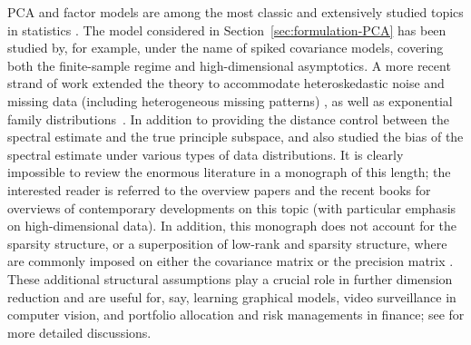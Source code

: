 PCA and factor models are among the most classic and extensively studied topics in statistics \citep{anderson1962introduction,fan2020statistical,wainwright2019high}. The model considered in Section~\ref{sec:formulation-PCA} has been studied by, for example, \citet{johnstone2001distribution,paul2007asymptotics,nadler2008finite, perry2016optimality, xie2018sequential, wang2017asymptotics, fan2018spiked, bao2020statistical}  under the name of  spiked covariance models,  
covering both the finite-sample regime and high-dimensional asymptotics.
A more recent strand of work extended the theory to accommodate heteroskedastic noise and missing data (including heterogeneous missing patterns) \citep{lounici2014high,zhang2018heteroskedastic,cai2019subspace,zhu2019high}, as well as exponential family distributions~\citep{liu2018pca}. In addition to providing the distance control between the spectral estimate and the true principle subspace, \citet{koltchinskii2016asymptotics} and \citet{fan2019distributed} also studied the bias of the spectral estimate under various types of data distributions.
It is clearly impossible to review the enormous literature in a monograph of this length; the interested reader is referred to the overview papers \citet{johnstone2018pca,fan2018PCA,vaswani2018rethinking,balzano2018streaming}  and the recent books
  \citet{fan2020statistical,wainwright2019high} for overviews of contemporary developments on this topic (with particular emphasis on high-dimensional data).
In addition, this monograph does not account for the sparsity structure, or a superposition of low-rank and sparsity structure,  where are commonly imposed on either the covariance matrix or the precision matrix \citep{JohLu09,ma2013sparse,vu2012minimax,cai2013sparse,candes2011robust,chandrasekaran2011rank,chandrasekaran2010latent}. These additional structural assumptions play a crucial role in further dimension reduction and are useful for, say, learning graphical models, video surveillance in computer vision, and portfolio allocation and risk managements in finance;   see \citet{fan2020statistical,ma2016GPCA,wainwright2019high,wright2020high} for more detailed discussions.





